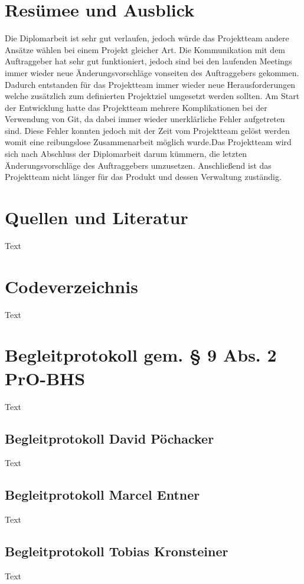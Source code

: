 \chapter{Resümee und Ausblick}
Die Diplomarbeit ist sehr gut verlaufen, jedoch würde das Projektteam andere Ansätze wählen bei einem Projekt gleicher Art. Die Kommunikation mit dem Auftraggeber hat sehr gut funktioniert, jedoch sind bei den laufenden Meetings immer wieder neue Änderungsvorschläge vonseiten des Auftraggebers gekommen. Dadurch entstanden für das Projektteam immer wieder neue Herausforderungen welche zusätzlich zum definierten Projektziel umgesetzt werden sollten. Am Start der Entwicklung hatte das Projektteam mehrere Komplikationen bei der Verwendung  von Git, da dabei immer wieder unerklärliche Fehler aufgetreten sind. Diese Fehler konnten jedoch mit der Zeit vom Projektteam gelöst werden womit eine reibungslose Zusammenarbeit möglich wurde.Das Projektteam wird sich nach Abschluss der Diplomarbeit darum kümmern, die letzten Änderungsvorschläge des Auftraggebers umzusetzen. Anschließend ist das Projektteam nicht länger für das Produkt und dessen Verwaltung zuständig.


\chapter{Quellen und Literatur}
Text

\listoffigures

\listoftables

\chapter{Codeverzeichnis}
Text


\chapter{Begleitprotokoll gem. § 9 Abs. 2 PrO-BHS}
Text
\section{Begleitprotokoll David Pöchacker}
Text

\section{Begleitprotokoll Marcel Entner}
Text
\section{Begleitprotokoll Tobias Kronsteiner}
Text



